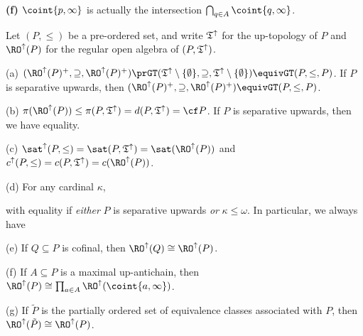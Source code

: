 {\medskip

{\bf (f)} $\coint{p,\infty}$ is actually the intersection
$\bigcap_{q\in A}\coint{q,\infty}$.
}%

 Let $(P,\le)$ be a pre-ordered set, and
write $\frak T^{\uparrow}$ for the up-topology of $P$ and
$\RO^{\uparrow}(P)$ for the regular open algebra of
$(P,\frak T^{\uparrow})$.

(a) $(\RO^{\uparrow}(P)^+,\supseteq,\RO^{\uparrow}(P)^+)
\prGT(\frak T^{\uparrow}\setminus\{\emptyset\},\supseteq,
  \frak T^{\uparrow}\setminus\{\emptyset\})
\equivGT(P,\le,P)$.   If $P$ is separative upwards, then
$(\RO^{\uparrow}(P)^+,\supseteq,\penalty-100\RO^{\uparrow}(P)^+)
\equivGT(P,\le,P)$.

(b) $\pi(\RO^{\uparrow}(P))\le\pi(P,\frak T^{\uparrow})
=d(P,\frak T^{\uparrow})=\cf P$.   If $P$ is separative upwards,
then we have equality.

(c) $\sat^{\uparrow}(P,\le)
=\sat(P,\frak T^{\uparrow})=\sat(\RO^{\uparrow}(P))$ and
$c^{\uparrow}(P,\le)
=c(P,\frak T^{\uparrow})=c(\RO^{\uparrow}(P))$.

(d) For any cardinal $\kappa$,


\noindent with equality if {\it either} $P$ is separative upwards {\it or}
$\kappa\le\omega$.   In particular, we always have


(e) If $Q\subseteq P$ is cofinal, then
$\RO^{\uparrow}(Q)\cong\RO^{\uparrow}(P)$.

(f) If $A\subseteq P$ is a maximal up-antichain, then
$\RO^{\uparrow}(P)\cong\prod_{a\in A}\RO^{\uparrow}(\coint{a,\infty})$.

(g) If $\tilde P$ is the partially ordered set of equivalence classes
associated with $P$, then $\RO^{\uparrow}(\tilde P)\cong\RO^{\uparrow}(P)$.


